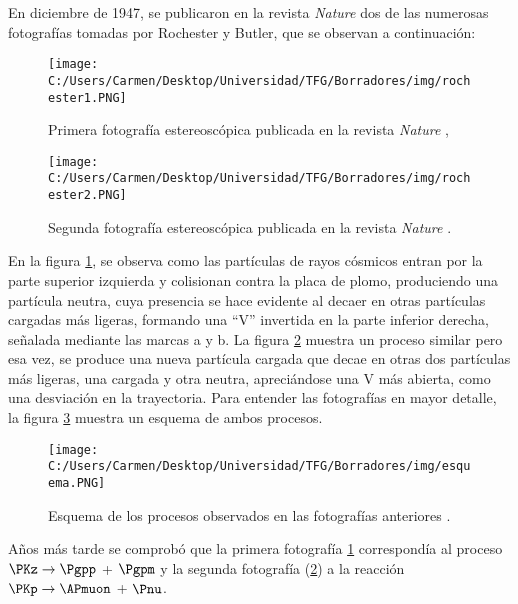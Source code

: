 En diciembre de 1947, se publicaron en la revista \textit{Nature} dos de las numerosas fotografías tomadas por Rochester y Butler, que se observan a continuación:

\begin{figure}[h!]
	\centering
	\texttt{[image: C:/Users/Carmen/Desktop/Universidad/TFG/Borradores/img/rochester1.PNG]}
	\caption[Fotografía 1 de la primera detección de los mesones $\PK$]
	{Primera fotografía estereoscópica publicada en la revista \textit{Nature} \cite{Nature1},}
	\label{fig:nature1}
\end{figure}
\begin{figure}[h!]
	\centering
	\texttt{[image: C:/Users/Carmen/Desktop/Universidad/TFG/Borradores/img/rochester2.PNG]}
	\caption[Fotografía 2 de la primera detección de los mesones $\PK$]
	{Segunda fotografía estereoscópica publicada en la revista \textit{Nature} \cite{Nature1}.}
	\label{fig:nature2}
\end{figure}

En la figura \ref{fig:nature1}, se observa como las partículas de rayos cósmicos entran por la parte superior izquierda y colisionan contra la placa de plomo, produciendo una partícula neutra, cuya presencia se hace evidente al decaer en otras partículas cargadas más ligeras, formando una ``V'' invertida en la parte inferior derecha, señalada mediante las marcas a y b. La figura \ref{fig:nature2} muestra un proceso similar pero esa vez, se produce una nueva partícula cargada que decae en otras dos partículas más ligeras, una cargada y otra neutra, apreciándose una V más abierta, como una desviación en la trayectoria. Para entender las fotografías en mayor detalle, la figura \ref{fig:esquema1} muestra un esquema de ambos procesos.

\begin{figure}[h!]
	\centering
	\texttt{[image: C:/Users/Carmen/Desktop/Universidad/TFG/Borradores/img/esquema.PNG]}
	\caption[Esquema para entender las fotos estereoscópicas]
	{Esquema de los procesos observados en las fotografías anteriores \cite{Franzini}.}
	\label{fig:esquema1}
\end{figure}

Años más tarde se comprobó que la primera fotografía \ref{fig:nature1} correspondía al proceso  $\PKz \rightarrow \Pgpp$ +  $\Pgpm$ y la segunda fotografía (\ref{fig:nature2}) a la reacción $\PKp \rightarrow \APmuon$ + $\Pnu$.

